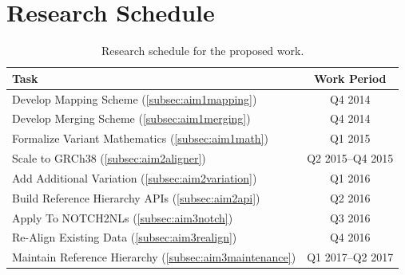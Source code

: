 \documentclass[11pt,proposal]{ucthesis}
\begin{document}



    

\appendix
\chapter{Research Schedule}

\begin{table}[ht]
    \centering
    \begin{tabular}{l|c}
        \textbf{Task} & \textbf{Work Period} \\
        \hline
        Develop Mapping Scheme (\ref{subsec:aim1mapping}) & Q4 2014 \\
        Develop Merging Scheme (\ref{subsec:aim1merging}) & Q4 2014 \\
        Formalize Variant Mathematics (\ref{subsec:aim1math}) & Q1 2015 \\
        Scale to GRCh38 (\ref{subsec:aim2aligner}) & Q2 2015--Q4 2015 \\
        Add Additional Variation (\ref{subsec:aim2variation}) & Q1 2016 \\
        Build Reference Hierarchy APIs (\ref{subsec:aim2api}) & Q2 2016 \\
        Apply To NOTCH2NLs (\ref{subsec:aim3notch}) & Q3 2016 \\
        Re-Align Existing Data (\ref{subsec:aim3realign}) & Q4 2016 \\
        Maintain Reference Hierarchy (\ref{subsec:aim3maintenance}) & Q1 2017--Q2 2017 \\ 
    \end{tabular}    
    \caption{Research schedule for the proposed work.} 
    \label{tbl:schedule}
\end{table}




\def\baselinestretch{1.0}\large\normalsize



\end{document}
